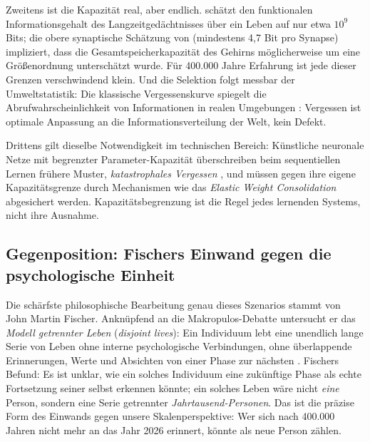 \documentclass[acmlarge, noacm]{acmart}
\begin{document}
Zweitens ist die Kapazität real, aber endlich. \citet{landauer1986} schätzt den funktionalen Informationsgehalt des Langzeitgedächtnisses über ein Leben auf nur etwa $10^9$ Bits; die obere synaptische Schätzung von \citet{bartol2015} (mindestens 4,7 Bit pro Synapse) impliziert, dass die Gesamtspeicherkapazität des Gehirns möglicherweise um eine Größenordnung unterschätzt wurde. Für 400.000 Jahre Erfahrung ist jede dieser Grenzen verschwindend klein. Und die Selektion folgt messbar der Umweltstatistik: Die klassische Vergessenskurve \cite{ebbinghaus1885, murre_dros2015} spiegelt die Abrufwahrscheinlichkeit von Informationen in realen Umgebungen \cite{anderson_schooler1991}: Vergessen ist optimale Anpassung an die Informationsverteilung der Welt, kein Defekt.

Drittens gilt dieselbe Notwendigkeit im technischen Bereich: Künstliche neuronale Netze mit begrenzter Parameter-Kapazität überschreiben beim sequentiellen Lernen frühere Muster, \textit{katastrophales Vergessen} \cite{kirkpatrick2017}, und müssen gegen ihre eigene Kapazitätsgrenze durch Mechanismen wie das \textit{Elastic Weight Consolidation} abgesichert werden. Kapazitätsbegrenzung ist die Regel jedes lernenden Systems, nicht ihre Ausnahme.

\subsection{Gegenposition: Fischers Einwand gegen die psychologische Einheit}

Die schärfste philosophische Bearbeitung genau dieses Szenarios stammt von John Martin Fischer. Anknüpfend an die Makropulos-Debatte untersucht er das \textit{Modell getrennter Leben} (\textit{disjoint lives}): Ein Individuum lebt eine unendlich lange Serie von Leben ohne interne psychologische Verbindungen, ohne überlappende Erinnerungen, Werte und Absichten von einer Phase zur nächsten \cite{fischer2020}. Fischers Befund: Es ist unklar, wie ein solches Individuum eine zukünftige Phase als echte Fortsetzung seiner selbst erkennen könnte; ein solches Leben wäre nicht \textit{eine} Person, sondern eine Serie getrennter \textit{Jahrtausend-Personen}. Das ist die präzise Form des Einwands gegen unsere Skalenperspektive: Wer sich nach 400.000 Jahren nicht mehr an das Jahr 2026 erinnert, könnte als neue Person zählen.
\end{document}
